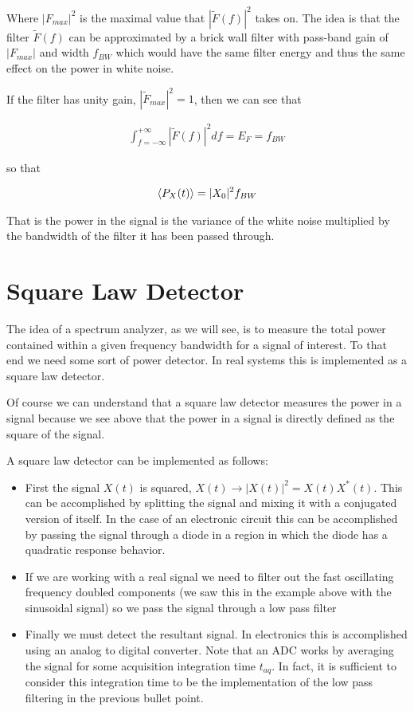 \documentclass[12pt]{article}
\begin{document}
Where $|F_{max}|^2$ is the maximal value that $|\tilde{F}(f)|^2$ takes on.
The idea is that the filter $\tilde{F}(f)$ can be approximated by a brick wall filter with pass-band gain of $|F_{max}|$ and width $f_{BW}$ which would have the same filter energy and thus the same effect on the power in white noise.

If the filter has unity gain, $|\tilde{F}_{max}|^2 = 1$, then we can see that

\begin{align}
\int_{f=-\infty}^{+\infty}|\tilde{F}(f)|^2 df = E_F = f_{BW}
\end{align}

so that

\begin{align}
\Braket{P_X(t)} = |X_0|^2 f_{BW}
\end{align}

That is the power in the signal is the variance of the white noise multiplied by the bandwidth of the filter it has been passed through.

\section{Square Law Detector}

The idea of a spectrum analyzer, as we will see, is to measure the total power contained within a given frequency bandwidth for a signal of interest.
To that end we need some sort of power detector.
In real systems this is implemented as a square law detector.

Of course we can understand that a square law detector measures the power in a signal because we see above that the power in a signal is directly defined as the square of the signal.

A square law detector can be implemented as follows:

\begin{itemize}
\item{First the signal $X(t)$ is squared, $X(t)\rightarrow |X(t)|^2 = X(t)X^*(t)$. This can be accomplished by splitting the signal and mixing it with a conjugated version of itself. In the case of an electronic circuit this can be accomplished by passing the signal through a diode in a region in which the diode has a quadratic response behavior.}
\item{If we are working with a real signal we need to filter out the fast oscillating frequency doubled components (we saw this in the example above with the sinusoidal signal) so we pass the signal through a low pass filter}
\item{Finally we must detect the resultant signal. In electronics this is accomplished using an analog to digital converter. Note that an ADC works by averaging the signal for some acquisition integration time $t_{aq}$. In fact, it is sufficient to consider this integration time to be the implementation of the low pass filtering in the previous bullet point.}
\end{itemize}
\end{document}
